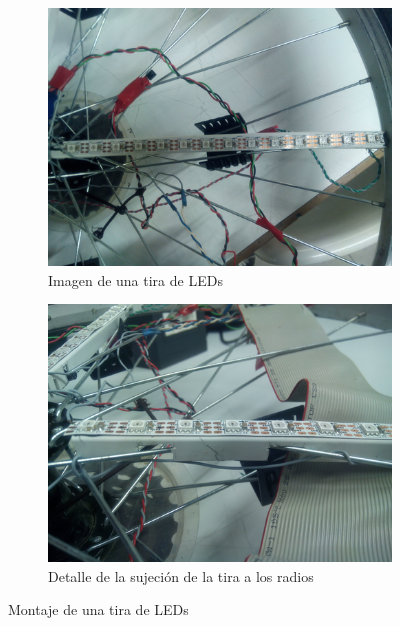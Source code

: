 \begin{figure}[!ht]
	\centering

	\begin{subfigure}[t]{0.4\textwidth}
		\centering
		\includegraphics[width=\textwidth]{images/tiraLEDs-completa}
		\caption{Imagen de una tira de LEDs}
		\label{fig:tiraLEDs-completa}
	\end{subfigure}
	\hspace{0.5cm}
	\begin{subfigure}[t]{0.4\textwidth}
		\centering
		\includegraphics[width=\textwidth]{images/tiraLEDs-sujecion}
		\caption{Detalle de la sujeción de la tira a los radios}
		\label{fig:tiraLEDs-sujecion}
	\end{subfigure}

	\caption{Montaje de una tira de LEDs}
	\label{fig:tiraLEDs}
\end{figure}

